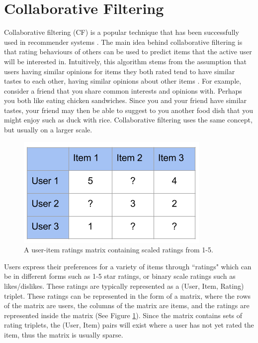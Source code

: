 \section{Collaborative Filtering}

Collaborative filtering (CF) is a popular technique that has been successfully used in recommender systems \cite{itembased, schafer2007collaborative, survey}. The main idea behind collaborative filtering is that rating behaviours of others can be used to predict items that the active user will be interested in. Intuitively, this algorithm stems from the assumption that users having similar opinions for items they both rated tend to have similar tastes to each other, having similar opinions about other items  \cite{schafer2007collaborative}. For example, consider a friend that you share common interests and opinions with. Perhaps you both like eating chicken sandwiches. Since you and your friend have similar tastes, your friend may then be able to suggest to you another food dish that you might enjoy such as duck with rice. Collaborative filtering uses the same concept, but usually on a larger scale. 

\begin{figure}
\centering
\includegraphics[scale=0.7]{images/User-Item}
\caption{A user-item ratings matrix containing scaled ratings from 1-5.}
\label{fig:matrix}
\end{figure}

Users express their preferences for a variety of items through ``ratings" which can be in different forms such as 1-5 star ratings, or binary scale ratings such as likes/dislikes. These ratings are typically represented as a (User, Item, Rating) triplet. These ratings can be represented in the form of a matrix, where the rows of the matrix are users, the columns of the matrix are items, and the ratings are represented inside the matrix (See Figure \ref{fig:matrix}). Since the matrix contains sets of rating triplets, the (User, Item) pairs will exist where a user has not yet rated the item, thus the matrix is usually sparse.

